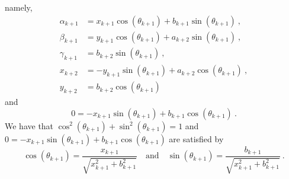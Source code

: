 namely,
\begin{equation}\label{C14L36}
\begin{split}
\alpha_{k+1} &= x_{k+1} \cos(\theta_{k+1}) + b_{k+1} \sin(\theta_{k+1}) \ , \\
\beta_{k+1} &= y_{k+1} \cos(\theta_{k+1}) + a_{k+2} \sin(\theta_{k+1}) \ , \\
\gamma_{k+1} &= b_{k+2} \sin(\theta_{k+1}) \ , \\
x_{k+2} &= - y_{k+1} \sin(\theta_{k+1}) + a_{k+2} \cos(\theta_{k+1}) \ , \\
y_{k+2} & = b_{k+2} \cos(\theta_{k+1})
\end{split}
\end{equation}
and
\[
0 = -x_{k+1} \sin(\theta_{k+1}) + b_{k+1} \cos(\theta_{k+1}) \ .
\]
We have that $\cos^2(\theta_{k+1})+\sin^2(\theta_{k+1}) = 1$ and
$0 = -x_{k+1} \sin(\theta_{k+1}) + b_{k+1} \cos(\theta_{k+1})$ are
satisfied by
\begin{equation} \label{C14L37}
\cos(\theta_{k+1}) = \frac{x_{k+1}}{\sqrt{x_{k+1}^2 + b_{k+1}^2}} \quad
\text{and} \quad
\sin(\theta_{k+1}) = \frac{b_{k+1}}{\sqrt{x_{k+1}^2 + b_{k+1}^2}} \ .
\end{equation}

